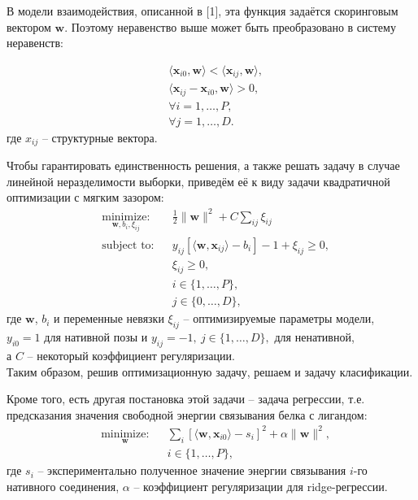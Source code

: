 \documentclass[12pt,twoside]{article}
\begin{document}
В модели взаимодействия, описанной в [1], эта функция задаётся скоринговым вектором $\mathbf{w}$. Поэтому неравенство выше может быть преобразовано в систему неравенств:
 
\begin{equation}\label{eq9}
\begin{split}
& \langle\mathbf{x}_{i0}, \mathbf{w}\rangle < \langle\mathbf{x}_{ij}, \mathbf{w}\rangle, \\
& \langle\mathbf{x}_{ij} - \mathbf{x}_{i0}, \mathbf{w}\rangle > 0, \\
& \forall i = 1,\dots, P, \\
& \forall j = 1, \dots, D.
\end{split}
\end{equation}
где $x_{ij}$ -- структурные вектора.  

Чтобы гарантировать единственность решения, а также решать задачу в случае линейной неразделимости выборки, приведём её к виду задачи квадратичной оптимизации с мягким зазором:
\begin{equation}\label{eq10}
\begin{aligned}
& \underset{\mathbf{w}, b_i, \xi_{ij}}{\text{minimize:}}
& & \frac{1}{2} \|\mathbf{w}\|^2 + C\sum\limits_{ij}\xi_{ij} \\
& \text{subject to:}
& & y_{ij}[\langle\mathbf{w},\mathbf{x}_{ij}\rangle - b_i]-1+\xi_{ij} \geq 0, \\
&&& \xi_{ij} \geq 0,\\
&&&i\in\{1,\dots,P\}, \\
&&&j\in\{0,\dots,D\},
\end{aligned}
\end{equation}
где $\mathbf{w}$, $b_i$ и переменные невязки $\xi_{ij}$ -- оптимизируемые параметры модели, \\
$y_{i0}=1$ для нативной позы и $y_{ij}=-1, \ j\in\{1,\dots,D\},$ для ненативной,\\
а $C$ -- некоторый коэффициент регуляризации. \\
Таким образом, решив оптимизационную задачу, решаем и задачу класификации.

Кроме того, есть другая постановка этой задачи -- задача регрессии, т.е. предсказания значения свободной энергии связывания белка с лигандом:
\begin{equation}\label{eq11}
\begin{aligned}
& \underset{\mathbf{w}}{\text{minimize:}}
& & \sum\limits_{i}[\langle\mathbf{w},\mathbf{x}_{i0}\rangle - s_i]^2 + \alpha\|\mathbf{w}\|^2, \\
&&& i\in\{1,\dots,P\},
\end{aligned}
\end{equation}
где $s_i$ -- экспериментально полученное значение энергии связывания $i$-го нативного соединения, $\alpha$ -- коэффициент регуляризации для ridge-регрессии. 
\end{document}
